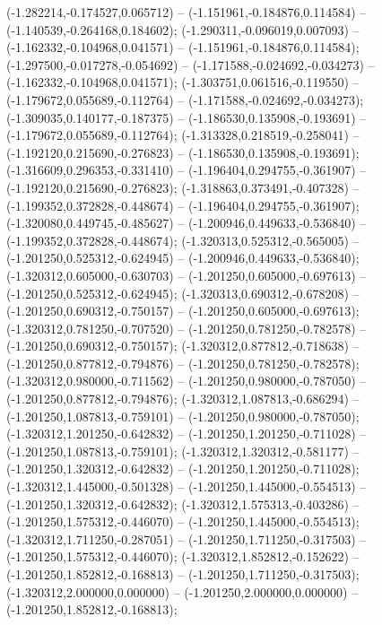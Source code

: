  (-1.282214,-0.174527,0.065712) -- (-1.151961,-0.184876,0.114584) -- (-1.140539,-0.264168,0.184602);
 (-1.290311,-0.096019,0.007093) -- (-1.162332,-0.104968,0.041571) -- (-1.151961,-0.184876,0.114584);
 (-1.297500,-0.017278,-0.054692) -- (-1.171588,-0.024692,-0.034273) -- (-1.162332,-0.104968,0.041571);
 (-1.303751,0.061516,-0.119550) -- (-1.179672,0.055689,-0.112764) -- (-1.171588,-0.024692,-0.034273);
 (-1.309035,0.140177,-0.187375) -- (-1.186530,0.135908,-0.193691) -- (-1.179672,0.055689,-0.112764);
 (-1.313328,0.218519,-0.258041) -- (-1.192120,0.215690,-0.276823) -- (-1.186530,0.135908,-0.193691);
 (-1.316609,0.296353,-0.331410) -- (-1.196404,0.294755,-0.361907) -- (-1.192120,0.215690,-0.276823);
 (-1.318863,0.373491,-0.407328) -- (-1.199352,0.372828,-0.448674) -- (-1.196404,0.294755,-0.361907);
 (-1.320080,0.449745,-0.485627) -- (-1.200946,0.449633,-0.536840) -- (-1.199352,0.372828,-0.448674);
 (-1.320313,0.525312,-0.565005) -- (-1.201250,0.525312,-0.624945) -- (-1.200946,0.449633,-0.536840);
 (-1.320312,0.605000,-0.630703) -- (-1.201250,0.605000,-0.697613) -- (-1.201250,0.525312,-0.624945);
 (-1.320313,0.690312,-0.678208) -- (-1.201250,0.690312,-0.750157) -- (-1.201250,0.605000,-0.697613);
 (-1.320312,0.781250,-0.707520) -- (-1.201250,0.781250,-0.782578) -- (-1.201250,0.690312,-0.750157);
 (-1.320312,0.877812,-0.718638) -- (-1.201250,0.877812,-0.794876) -- (-1.201250,0.781250,-0.782578);
 (-1.320312,0.980000,-0.711562) -- (-1.201250,0.980000,-0.787050) -- (-1.201250,0.877812,-0.794876);
 (-1.320312,1.087813,-0.686294) -- (-1.201250,1.087813,-0.759101) -- (-1.201250,0.980000,-0.787050);
 (-1.320312,1.201250,-0.642832) -- (-1.201250,1.201250,-0.711028) -- (-1.201250,1.087813,-0.759101);
 (-1.320312,1.320312,-0.581177) -- (-1.201250,1.320312,-0.642832) -- (-1.201250,1.201250,-0.711028);
 (-1.320312,1.445000,-0.501328) -- (-1.201250,1.445000,-0.554513) -- (-1.201250,1.320312,-0.642832);
 (-1.320312,1.575313,-0.403286) -- (-1.201250,1.575312,-0.446070) -- (-1.201250,1.445000,-0.554513);
 (-1.320312,1.711250,-0.287051) -- (-1.201250,1.711250,-0.317503) -- (-1.201250,1.575312,-0.446070);
 (-1.320312,1.852812,-0.152622) -- (-1.201250,1.852812,-0.168813) -- (-1.201250,1.711250,-0.317503);
 (-1.320312,2.000000,0.000000) -- (-1.201250,2.000000,0.000000) -- (-1.201250,1.852812,-0.168813);
